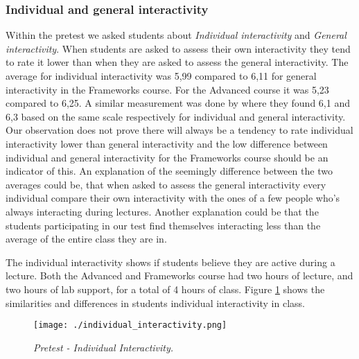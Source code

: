 
\subsubsection*{Individual and general interactivity}

Within the pretest we asked students about \emph{Individual interactivity} and \emph{General interactivity}. When students are asked to assess their own interactivity they tend to rate it lower than when they are asked to assess the general interactivity. The average for individual interactivity was 5,99 compared to 6,11 for general interactivity in the Frameworks course. For the Advanced course it was 5,23 compared to 6,25. A similar measurement was done by  where they found 6,1 and 6,3 based on the same scale respectively for individual and general interactivity. Our observation does not prove there will always be a tendency to rate individual interactivity lower than general interactivity and the low difference between individual and general interactivity for the Frameworks course should be an indicator of this. An explanation of the seemingly difference between the two averages could be, that when asked to assess the general interactivity every individual compare their own interactivity with the ones of a few people who's always interacting during lectures. Another explanation could be that the students participating in our test find themselves interacting less than the average of the entire class they are in.


The individual interactivity shows if students believe they are active during a lecture. Both the Advanced and Frameworks course had two hours of lecture, and two hours of lab support, for a total of 4 hours of class. Figure \ref{fig:individual_interactivity} shows the similarities and differences in students individual interactivity in class. 

 \begin{figure}[H]
  \centering
     \texttt{[image: ./individual\_interactivity.png]}
     \caption{\emph{Pretest - Individual Interactivity.}}
     \label{fig:individual_interactivity}
 \end{figure}

